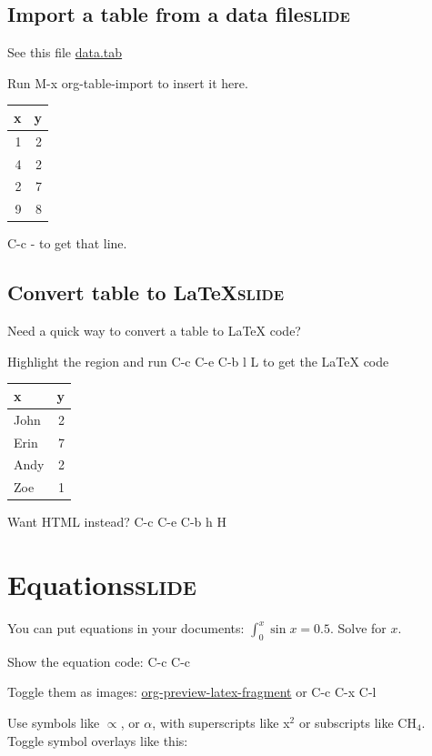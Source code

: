 \documentclass[11pt]{article}
\begin{document}
\subsection{Import a table from a data file\hfill{}\textsc{slide}}
\label{sec-9-6}
See this file \url{data.tab}

Run M-x org-table-import to insert it here.
\begin{center}
\begin{tabular}{rr}
x & y\\
\hline
1 & 2\\
4 & 2\\
2 & 7\\
9 & 8\\
\end{tabular}
\end{center}



C-c - to get that line.
\subsection{Convert table to \LaTeX{}\hfill{}\textsc{slide}}
\label{sec-9-7}

Need a quick way to convert a table to \LaTeX{} code?

Highlight the region and run C-c C-e C-b l L to get the \LaTeX{} code

\begin{center}
\begin{tabular}{lr}
x & y\\
\hline
John & 2\\
Erin & 7\\
Andy & 2\\
Zoe & 1\\
\end{tabular}
\end{center}

Want HTML instead?  C-c C-e C-b h H

\section{Equations\hfill{}\textsc{slide}}
\label{sec-10}

You can put equations in your documents: $\int_0^x \sin x = 0.5$. Solve for $x$. 

Show the equation code: C-c C-c

Toggle them as images: \url{org-preview-latex-fragment} or C-c C-x C-l

Use symbols like $\propto$, or $\alpha$, with superscripts like x$^{\text{2}}$ or subscripts like CH$_{\text{4}}$. Toggle symbol overlays like this:
\end{document}
